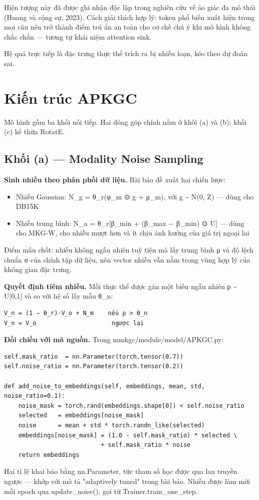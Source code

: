 \documentclass[11pt,a4paper]{article}
\newcommand{\code}[1]{{\ttfamily\small\color{codetext}#1}}
\begin{document}
Hiện tượng này đã được ghi nhận độc lập trong nghiên cứu về ảo giác đa mô thái (Huang và cộng sự, 2023). Cách giải thích hợp lý: token phổ biến xuất hiện trong mọi câu nên trở thành điểm trú ẩn an toàn cho cơ chế chú ý khi mô hình không chắc chắn --- tương tự khái niệm attention sink.

Hệ quả trực tiếp là đặc trưng thực thể trích ra bị nhiễu loạn, kéo theo dự đoán sai.

\section{Kiến trúc APKGC}
Mô hình gồm ba khối nối tiếp. Hai đóng góp chính nằm ở khối (a) và (b); khối (c) kế thừa RotatE.

\subsection{Khối (a) --- Modality Noise Sampling}
\textbf{Sinh nhiễu theo phân phối dữ liệu.} Bài báo đề xuất hai chiến lược:

\begin{itemize}\itemsep2pt
\item Nhiễu Gaussian: \code{N\_g = θ\_r(φ\_m ⊙ g + μ\_m)}, với \code{g \textasciitilde{} N(0, Z)} --- dùng cho DB15K
\item Nhiễu trung bình: \code{N\_a = θ\_r[β\_min + (β\_max − β\_min) ⊙ U]} --- dùng cho MKG-W, cho nhiễu mượt hơn và ít chịu ảnh hưởng của giá trị ngoại lai
\end{itemize}
Điểm mấu chốt: nhiễu không ngẫu nhiên tuỳ tiện mà lấy trung bình \code{μ} và độ lệch chuẩn \code{σ} của chính tập dữ liệu, nên vector nhiễu vẫn nằm trong vùng hợp lý của không gian đặc trưng.

\textbf{Quyết định tiêm nhiễu.} Mỗi thực thể được gán một biến ngẫu nhiên \code{ρ \textasciitilde{} U[0,1]} và so với hệ số lấy mẫu \code{θ\_n}:

\begin{lstlisting}
V_n = (1 − θ_r)·V_o + N_m    nếu ρ > θ_n
V_n = V_o                     ngược lại
\end{lstlisting}
\textbf{Đối chiếu với mã nguồn.} Trong \code{mmkgc/module/model/APKGC.py}:

\begin{lstlisting}
self.mask_ratio  = nn.Parameter(torch.tensor(0.7))
self.noise_ratio = nn.Parameter(torch.tensor(0.2))

def add_noise_to_embeddings(self, embeddings, mean, std, noise_ratio=0.1):
    noise_mask = torch.rand(embeddings.shape[0]) < self.noise_ratio
    selected   = embeddings[noise_mask]
    noise      = mean + std * torch.randn_like(selected)
    embeddings[noise_mask] = (1.0 - self.mask_ratio) * selected \
                           + self.mask_ratio * noise
    return embeddings
\end{lstlisting}
Hai tỉ lệ khai báo bằng \code{nn.Parameter}, tức tham số học được qua lan truyền ngược --- khớp với mô tả "adaptively tuned" trong bài báo. Nhiễu được làm mới mỗi epoch qua \code{update\_noise()}, gọi từ \code{Trainer.train\_one\_step}.
\end{document}
